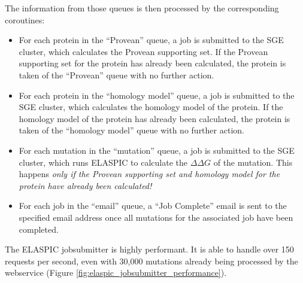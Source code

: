 The information from those queues is then processed by the corresponding coroutines:

\begin{itemize}
	\itemsep0em
	\item For each protein in the ``Provean'' queue, a job is submitted to the SGE cluster, which calculates the Provean supporting set. If the Provean supporting set for the protein has already been calculated, the protein is taken of the ``Provean'' queue with no further action.
	\item For each protein in the ``homology model'' queue, a job is submitted to the SGE cluster, which calculates the homology model of the protein. If the homology model of the protein has already been calculated, the protein is taken of the ``homology model'' queue with no further action.
	\item For each mutation in the ``mutation'' queue, a job is submitted to the SGE cluster, which runs ELASPIC to calculate the $\Delta \Delta G$ of the mutation. This happens \textit{only if the Provean supporting set and homology model for the protein have already been calculated!}
	\item For each job in the ``email'' queue, a ``Job Complete'' email is sent to the specified email address once all mutations for the associated job have been completed.
\end{itemize}

The ELASPIC jobsubmitter is highly performant. It is able to handle over 150 requests per second, even with 30,000 mutations already being processed by the webservice (Figure \ref{fig:elaspic_jobsubmitter_performance}).

